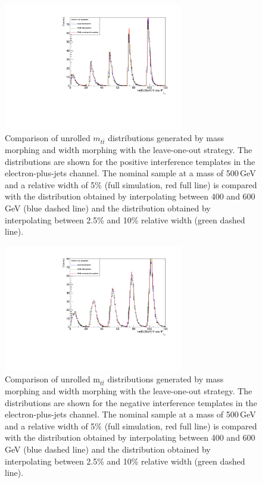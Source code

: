 \begin{figure}[!Hhtb]
\centering
\includegraphics[width=0.7\textwidth,keepaspectratio=true]{fig/chapt8/morphing/mass_morph_ll_pos-int-5pc-M500.pdf}
\caption{Comparison of unrolled $m_{t\bar t}$ distributions generated by mass morphing and width morphing with the leave-one-out strategy. The distributions are shown for the positive interference templates in the electron-plus-jets channel. The nominal sample at a mass of 500\,GeV and a relative width of 5\% (full simulation, red full line) is compared with the distribution obtained by interpolating between 400 and 600\,GeV (blue dashed line) and the distribution obtained by interpolating between 2.5\% and 10\% relative width (green dashed line).}
\label{fig:morph_mass_ll_posint_500_5}
\end{figure}


\begin{figure}[!Hhtb]
\centering
\includegraphics[width=0.7\textwidth,keepaspectratio=true]{fig/chapt8/morphing/mass_morph_ll_neg-int-5pc-M500.pdf}
\caption{Comparison of unrolled m$_{t\bar t}$ distributions generated by mass morphing and width morphing with the leave-one-out strategy. The distributions are shown for the negative interference templates in the electron-plus-jets channel. The nominal sample at a mass of 500\,GeV and a relative width of 5\% (full simulation, red full line) is compared with the distribution obtained by interpolating between 400 and 600\,GeV (blue dashed line) and the distribution obtained by interpolating between 2.5\% and 10\% relative width (green dashed line).}
\label{fig:morph_mass_ll_negint_500_5}
\end{figure}

